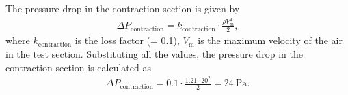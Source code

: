 The pressure drop in the contraction section is given by
\begin{align}
\Delta P_{\text{contraction}} = k_{\text{contraction}} \cdot \frac{\rho V_{\text{m}}^2}{2},
\end{align}
where $k_{\text{contraction}}$ is the loss factor (= 0.1), $V_{\text{m}}$ is the maximum velocity of the air in the test section. Substituting all the values, the pressure drop in the contraction section is calculated as
\begin{align}\label{pressure drop contraction value}
\Delta P_{\text{contraction}} = 0.1 \cdot \frac{1.21 \cdot 20^2}{2} = 24~\text{Pa}.
\end{align}

